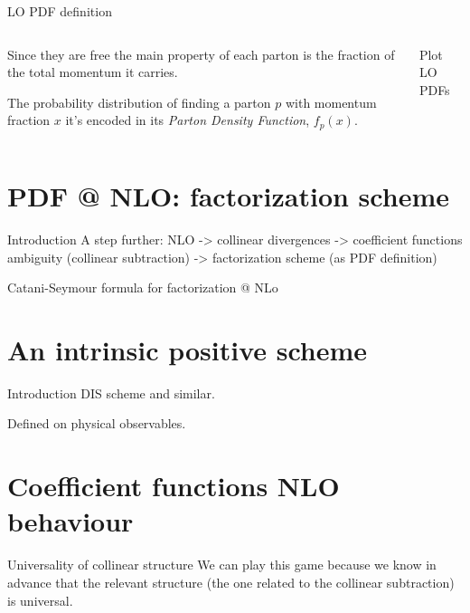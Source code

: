 \documentclass[9pt]{beamer}
\begin{document}
\begin{frame}{LO PDF definition}
    \begin{columns}
        \begin{column}{0.55\textwidth}
            Since they are free the main property of each parton is the
            fraction of the total momentum it carries.\newline

            The probability distribution of finding a parton $p$ with momentum
            fraction $x$ it's encoded in its \textit{Parton Density Function}\footnotemark,
            $f_p(x)$.
        \end{column}
        \begin{column}{0.45\textwidth}
            Plot LO PDFs 
        \end{column}
    \end{columns}
\end{frame}

\section{PDF @ NLO: factorization scheme}
\begin{frame}{Introduction}
    A step further: NLO -> collinear divergences -> coefficient functions ambiguity (collinear subtraction) -> factorization scheme (as PDF definition)

    Catani-Seymour formula for factorization @ NLo
\end{frame}

\section{An intrinsic positive scheme}
\begin{frame}{Introduction}
    DIS scheme and similar.

    Defined on physical observables.
\end{frame}

\section{Coefficient functions NLO behaviour}
\begin{frame}{Universality of collinear structure}
    We can play this game because we know in advance that the relevant structure (the one related to the collinear subtraction) is universal.
\end{frame}
\end{document}
